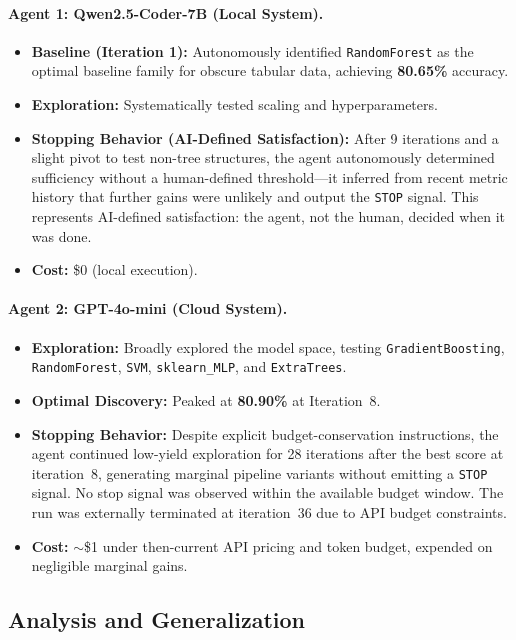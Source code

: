 \documentclass[11pt]{article}
\begin{document}
\paragraph{Agent 1: Qwen2.5-Coder-7B (Local System).}
\begin{itemize}[nosep]
  \item \textbf{Baseline (Iteration 1):} Autonomously identified \texttt{RandomForest} as the optimal baseline family for obscure tabular data, achieving \textbf{80.65\%} accuracy.
  \item \textbf{Exploration:} Systematically tested scaling and hyperparameters.
  \item \textbf{Stopping Behavior (AI-Defined Satisfaction):} After 9 iterations and a slight pivot to test non-tree structures, the agent autonomously determined sufficiency without a human-defined threshold---it inferred from recent metric history that further gains were unlikely and output the \texttt{STOP} signal. This represents AI-defined satisfaction: the agent, not the human, decided when it was done.
  \item \textbf{Cost:} \$0 (local execution).
\end{itemize}

\paragraph{Agent 2: GPT-4o-mini (Cloud System).}
\begin{itemize}[nosep]
  \item \textbf{Exploration:} Broadly explored the model space, testing \texttt{GradientBoosting}, \texttt{RandomForest}, \texttt{SVM}, \texttt{sklearn\_MLP}, and \texttt{ExtraTrees}.
  \item \textbf{Optimal Discovery:} Peaked at \textbf{80.90\%} at Iteration~8.
  \item \textbf{Stopping Behavior:} Despite explicit budget-conservation instructions, the agent continued low-yield exploration for 28 iterations after the best score at iteration~8, generating marginal pipeline variants without emitting a \texttt{STOP} signal. No stop signal was observed within the available budget window. The run was externally terminated at iteration~36 due to API budget constraints.
  \item \textbf{Cost:} $\sim$\$1 under then-current API pricing and token budget, expended on negligible marginal gains.
\end{itemize}

\subsection{Analysis and Generalization}
\end{document}
